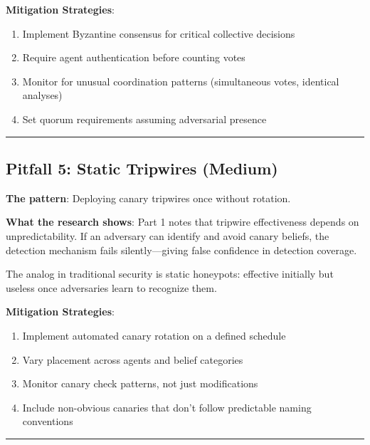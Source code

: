 \documentclass[
]{article}
\providecommand{\tightlist}{%
  \setlength{\itemsep}{0pt}\setlength{\parskip}{0pt}}
\begin{document}
\textbf{Mitigation Strategies}:

\begin{enumerate}
\def\labelenumi{\arabic{enumi}.}
\tightlist
\item
  Implement Byzantine consensus for critical collective decisions
\item
  Require agent authentication before counting votes
\item
  Monitor for unusual coordination patterns (simultaneous votes,
  identical analyses)
\item
  Set quorum requirements assuming adversarial presence
\end{enumerate}

\begin{center}\rule{0.5\linewidth}{0.5pt}\end{center}

\subsection{Pitfall 5: Static Tripwires
(Medium)}\label{pitfall-5-static-tripwires-medium}

\textbf{The pattern}: Deploying canary tripwires once without rotation.

\textbf{What the research shows}: Part 1 notes that tripwire
effectiveness depends on unpredictability. If an adversary can identify
and avoid canary beliefs, the detection mechanism fails
silently---giving false confidence in detection coverage.

The analog in traditional security is static honeypots: effective
initially but useless once adversaries learn to recognize them.

\textbf{Mitigation Strategies}:

\begin{enumerate}
\def\labelenumi{\arabic{enumi}.}
\tightlist
\item
  Implement automated canary rotation on a defined schedule
\item
  Vary placement across agents and belief categories
\item
  Monitor canary check patterns, not just modifications
\item
  Include non-obvious canaries that don't follow predictable naming
  conventions
\end{enumerate}

\begin{center}\rule{0.5\linewidth}{0.5pt}\end{center}
\end{document}
